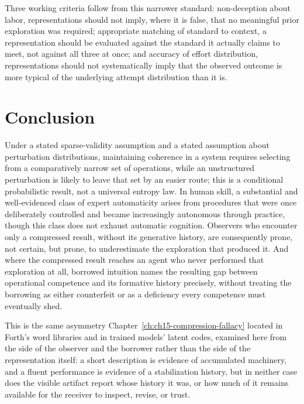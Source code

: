 Three working criteria follow from this narrower standard: non-deception about labor, representations should not imply, where it is false, that no meaningful prior exploration was required; appropriate matching of standard to context, a representation should be evaluated against the standard it actually claims to meet, not against all three at once; and accuracy of effort distribution, representations should not systematically imply that the observed outcome is more typical of the underlying attempt distribution than it is.

\section{Conclusion}

Under a stated sparse-validity assumption and a stated assumption about perturbation distributions, maintaining coherence in a system requires selecting from a comparatively narrow set of operations, while an unstructured perturbation is likely to leave that set by an easier route; this is a conditional probabilistic result, not a universal entropy law. In human skill, a substantial and well-evidenced class of expert automaticity arises from procedures that were once deliberately controlled and became increasingly autonomous through practice, though this class does not exhaust automatic cognition. Observers who encounter only a compressed result, without its generative history, are consequently prone, not certain, but prone, to underestimate the exploration that produced it. And where the compressed result reaches an agent who never performed that exploration at all, borrowed intuition names the resulting gap between operational competence and its formative history precisely, without treating the borrowing as either counterfeit or as a deficiency every competence must eventually shed.

This is the same asymmetry Chapter~\ref{ch:ch15-compression-fallacy} located in Forth's word libraries and in trained models' latent codes, examined here from the side of the observer and the borrower rather than the side of the representation itself: a short description is evidence of accumulated machinery, and a fluent performance is evidence of a stabilization history, but in neither case does the visible artifact report whose history it was, or how much of it remains available for the receiver to inspect, revise, or trust.
